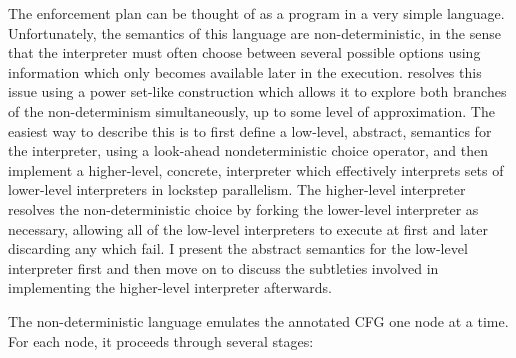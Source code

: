 
The enforcement plan can be thought of as a program in a very simple
language.  Unfortunately, the semantics of this language are
non-deterministic, in the sense that the interpreter must often choose
between several possible options using information which only becomes
available later in the execution.  {\Technique} resolves this issue
using a power set-like construction which allows it to explore both branches of the
non-determinism simultaneously, up to some level of approximation.
The easiest way to describe this is to first define a low-level,
abstract, semantics for the interpreter, using a look-ahead
nondeterministic choice operator, and then implement a higher-level,
concrete, interpreter which effectively interprets sets of lower-level
interpreters in lockstep parallelism.  The higher-level interpreter
resolves the non-deterministic choice by forking the lower-level
interpreter as necessary, allowing all of the low-level interpreters
to execute at first and later discarding any which fail.  I present
the abstract semantics for the low-level interpreter first and then
move on to discuss the subtleties involved in implementing the
higher-level interpreter afterwards.

The non-deterministic language emulates the annotated CFG one node at
a time.  For each node, it proceeds through several stages:

